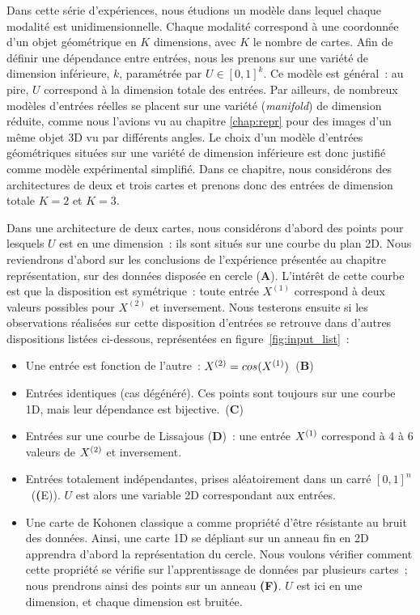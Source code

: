\documentclass[../main]{subfiles}
\begin{document}
Dans cette série d'expériences, nous étudions un modèle dans lequel chaque modalité est unidimensionnelle. Chaque modalité correspond à une coordonnée d'un objet géométrique en $K$ dimensions, avec  $K$ le nombre de cartes. Afin de définir une dépendance entre entrées, nous les prenons sur une variété de dimension inférieure, $k$,  paramétrée par $U \in [0,1]^k$.
Ce modèle est général~: au pire, $U$ correspond à la dimension totale des entrées. 
Par ailleurs, de nombreux modèles d'entrées réelles se placent sur une variété (\emph{manifold}) de dimension réduite, comme nous l'avions vu au chapitre \ref{chap:repr} pour des images d'un même objet 3D vu par différents angles. Le choix d'un modèle d'entrées géométriques situées sur une variété de dimension inférieure est donc justifié comme modèle expérimental simplifié.
Dans ce chapitre, nous considérons des architectures de deux et trois cartes et prenons donc des entrées de dimension totale $K = 2$ et $K = 3$.


Dans une architecture de deux cartes, nous considérons d'abord des points pour lesquels $U$ est en une dimension~: ils sont situés sur une courbe du plan 2D.
Nous reviendrons d'abord  sur les conclusions de l'expérience présentée au chapitre représentation, sur des données disposée en cercle (\textbf{A}). L'intérêt de cette courbe est que la disposition est symétrique~: toute entrée $X^{(1)}$ correspond à deux valeurs possibles pour $X^{(2)}$ et inversement.
Nous testerons ensuite si les observations réalisées sur cette disposition d'entrées se retrouve dans d'autres dispositions listées ci-dessous, représentées en figure~\ref{fig:input_list}~:
\begin{itemize}
	\item Une entrée est fonction de l'autre~: $X^{({2})} = cos(X^{({1})})$~(\textbf{B})
	\item Entrées identiques (cas dégénéré). Ces points sont toujours sur une courbe 1D, mais leur dépendance est bijective.~(\textbf{C})
	\item Entrées sur une courbe de Lissajous (\textbf{D})~: une entrée $X^{({1})}$ correspond à 4 à 6 valeurs de $X^{({2})}$ et inversement.
	\item Entrées totalement indépendantes, prises aléatoirement dans un carré $[0,1]^n$~(\textbf({E})). $U$ est alors une variable 2D correspondant aux entrées.
	\item Une carte de Kohonen classique a comme propriété d'être résistante au bruit des données. Ainsi, une carte 1D se dépliant sur un anneau fin en 2D apprendra d'abord la représentation du cercle. Nous voulons vérifier comment cette propriété se vérifie sur l'apprentissage de données par plusieurs cartes~; nous prendrons ainsi des points sur un anneau \textbf{(F)}. $U$ est ici en une dimension, et chaque dimension est bruitée.
\end{itemize}
\end{document}

